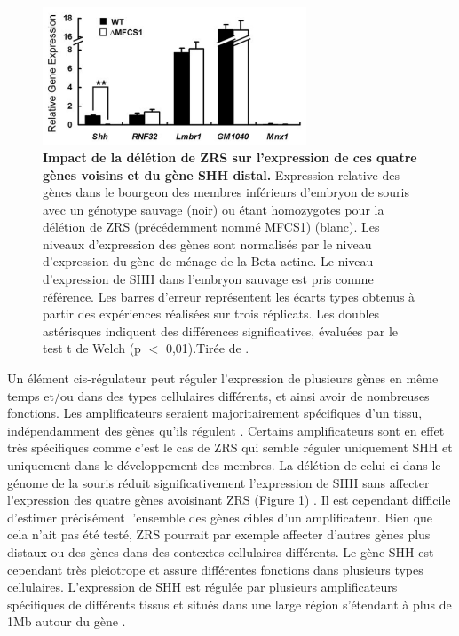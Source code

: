 \begin{figure}[hbt!]
 \centering
 \includegraphics[width=0.7\textwidth, page=1] {figures/introduction/fig22.png}
 \caption[Impact de la délétion de \acrshort{ZRS} sur l'expression de ces quatre gènes voisins et du gène \acrshort{SHH} distal.]{
 \textbf{Impact de la délétion de \acrshort{ZRS} sur l'expression de ces quatre gènes voisins et du gène \acrshort{SHH} distal.}
 Expression relative des gènes dans le bourgeon des membres inférieurs d'embryon de souris avec un génotype sauvage (noir) ou étant homozygotes pour la délétion de \acrshort{ZRS} (précédemment nommé MFCS1) (blanc). Les niveaux d'expression des gènes sont normalisés par le niveau d'expression du gène de ménage de la Beta-actine. Le niveau d'expression de \acrshort{SHH} dans l'embryon sauvage est pris comme référence. Les barres d'erreur représentent les écarts types obtenus à partir des expériences réalisées sur trois réplicats. Les doubles astérisques indiquent des différences significatives, évaluées par le test t de Welch (p $<$ 0,01).Tirée de \citet{amano_chromosomal_2009}.\\
 }
 \label{fig:Fig22}
\end{figure}

Un élément \gls{cis}-régulateur peut réguler l’expression de plusieurs gènes en même temps et/ou dans des types cellulaires différents, et ainsi avoir de nombreuses fonctions. Les \glspl{amplificateur} seraient majoritairement spécifiques d’un tissu, indépendamment des gènes qu’ils régulent \citep{singh_enhancer_2021}. Certains \glspl{amplificateur} sont en effet très spécifiques comme c’est le cas de \acrshort{ZRS} qui semble réguler uniquement \acrshort{SHH} et uniquement dans le développement des membres. La délétion de celui-ci dans le génome de la souris réduit significativement l’expression de \acrshort{SHH} sans affecter l'expression des quatre gènes avoisinant \acrshort{ZRS} (Figure \ref{fig:Fig22}) \citep{amano_chromosomal_2009}. Il est cependant difficile d’estimer précisément l’ensemble des gènes cibles d’un \gls{amplificateur}. Bien que cela n'ait pas été testé, \acrshort{ZRS} pourrait par exemple affecter d’autres gènes plus distaux ou des gènes dans des contextes cellulaires différents. Le gène \acrshort{SHH} est cependant très \gls{pleiotrope} et assure différentes fonctions dans plusieurs types cellulaires. L’expression de \acrshort{SHH} est régulée par plusieurs \glspl{amplificateur} spécifiques de différents tissus et situés dans une large région s’étendant à plus de 1Mb autour du gène \citep{epstein_regionalization_1999, lettice_long-range_2003}. \\

